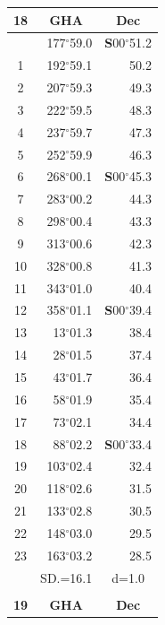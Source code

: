\documentclass[10pt, a4paper]{report}
\begin{document}
\begin{scriptsize}
\noindent
\begin{tabular*}{0.2\textwidth}[t]{@{\extracolsep{\fill}}|c|rr|}
\hline
\multicolumn{1}{|c|}{\rule{0pt}{2.6ex}\textbf{18}} & \multicolumn{1}{c}{\textbf{GHA}} & \multicolumn{1}{c|}{\textbf{Dec}}\\
\hline\rule{0pt}{2.6ex}\noindent
0 & 177$^\circ$59.0 & \textbf{S}00$^\circ$51.2\\
1 & 192$^\circ$59.1 & 50.2\\
2 & 207$^\circ$59.3 & 49.3\\
3 & 222$^\circ$59.5 & \raisebox{0.24ex}{\boldmath$\cdot$~\boldmath$\cdot$~~}48.3\\
4 & 237$^\circ$59.7 & 47.3\\
5 & 252$^\circ$59.9 & 46.3\\[2Pt]
6 & 268$^\circ$00.1 & \textbf{S}00$^\circ$45.3\\
7 & 283$^\circ$00.2 & 44.3\\
8 & 298$^\circ$00.4 & 43.3\\
9 & 313$^\circ$00.6 & \raisebox{0.24ex}{\boldmath$\cdot$~\boldmath$\cdot$~~}42.3\\
10 & 328$^\circ$00.8 & 41.3\\
11 & 343$^\circ$01.0 & 40.4\\[2Pt]
12 & 358$^\circ$01.1 & \textbf{S}00$^\circ$39.4\\
13 & 13$^\circ$01.3 & 38.4\\
14 & 28$^\circ$01.5 & 37.4\\
15 & 43$^\circ$01.7 & \raisebox{0.24ex}{\boldmath$\cdot$~\boldmath$\cdot$~~}36.4\\
16 & 58$^\circ$01.9 & 35.4\\
17 & 73$^\circ$02.1 & 34.4\\[2Pt]
18 & 88$^\circ$02.2 & \textbf{S}00$^\circ$33.4\\
19 & 103$^\circ$02.4 & 32.4\\
20 & 118$^\circ$02.6 & 31.5\\
21 & 133$^\circ$02.8 & \raisebox{0.24ex}{\boldmath$\cdot$~\boldmath$\cdot$~~}30.5\\
22 & 148$^\circ$03.0 & 29.5\\
23 & 163$^\circ$03.2 & 28.5\\
\hline
\rule{0pt}{2.4ex} & \multicolumn{1}{c}{SD.=16.1} & \multicolumn{1}{c|}{d=1.0}\\
\hline
\multicolumn{1}{c}{}\\[-0.5ex]\hline
\multicolumn{1}{|c|}{\rule{0pt}{2.6ex}\textbf{19}} & \multicolumn{1}{c}{\textbf{GHA}} & \multicolumn{1}{c|}{\textbf{Dec}}\\

\end{tabular*}
\end{scriptsize}
\end{document}
